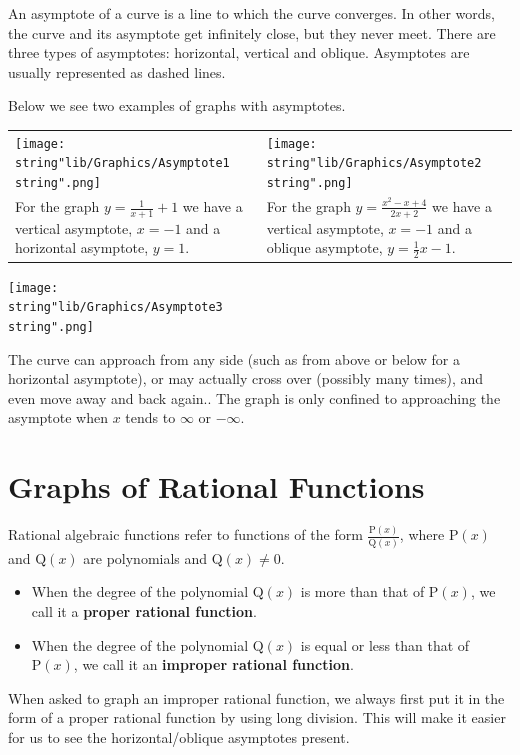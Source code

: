 \documentclass[11pt,a4paper]{book}
\begin{document}
An asymptote of a curve is a line to which the curve converges. In
other words, the curve and its asymptote get infinitely close, but
they never meet. There are three types of asymptotes: horizontal,
vertical and oblique. Asymptotes are usually represented as dashed lines.

\newpage

Below we see two examples of graphs with asymptotes.

\begin{tabular}{>{\centering}p{7.6cm}>{\centering}p{7.6cm}}
\texttt{[image: \\string"lib/Graphics/Asymptote1\\string".png]} & \texttt{[image: \\string"lib/Graphics/Asymptote2\\string".png]}\tabularnewline
For the graph ${\displaystyle y=\frac{1}{x+1}+1}$ we have a vertical
asymptote, $x=-1$ and a horizontal asymptote, $y=1$. & For the graph ${\displaystyle y=\frac{x^{2}-x+4}{2x+2}}$ we have
a vertical asymptote, $x=-1$ and a oblique asymptote, ${\displaystyle y=\frac{1}{2}x-1}$.\tabularnewline
\end{tabular}

\medskip{}

\begin{minipage}{0.5\textwidth}
\texttt{[image: \\string"lib/Graphics/Asymptote3\\string".png]}
\end{minipage}
\begin{minipage}{0.5\textwidth}
The curve can approach from any side (such as from above or below
for a horizontal asymptote), or may actually cross over (possibly
many times), and even move away and back again.. The graph is only confined to approaching the asymptote when $x$ tends to $\infty$ or $-\infty$.
\end{minipage}



\section{Graphs of Rational Functions}

Rational algebraic functions refer to functions of the form ${\displaystyle \frac{\text{P}(x)}{\text{Q}(x)}}$,
where $\text{P}(x)$ and $\text{Q}(x)$ are polynomials and $\text{Q}(x)\neq0$.
\begin{itemize}
\item When the degree of the polynomial $\text{Q}\left(x\right)$ is more than that of $\text{P}(x)$, we call it a \textbf{proper rational function}.
\item When the degree of the polynomial $\text{Q}\left(x\right)$ is equal or less than that of $\text{P}(x)$, we call it an \textbf{improper rational function}.
\end{itemize}
When asked to graph an improper rational function, we always first
put it in the form of a proper rational function by using long division. This will make it easier for us to see the horizontal/oblique asymptotes present.
\end{document}
